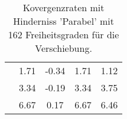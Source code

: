 \begin{table}
\begin{tabular}{c|cc|cc|}
\multicolumn{1}{|c|}{} & \multicolumn{1}{|c|}{      1.71} & \multicolumn{1}{|c|}{     -0.34} & \multicolumn{1}{|c|}{      1.71} & \multicolumn{1}{|c|}{      1.12} \\ 
\multicolumn{1}{|c|}{} & \multicolumn{1}{|c|}{      3.34} & \multicolumn{1}{|c|}{     -0.19} & \multicolumn{1}{|c|}{      3.34} & \multicolumn{1}{|c|}{      3.75} \\ 
\multicolumn{1}{|c|}{} & \multicolumn{1}{|c|}{      6.67} & \multicolumn{1}{|c|}{      0.17} & \multicolumn{1}{|c|}{      6.67} & \multicolumn{1}{|c|}{      6.46} \\ 
\hline 
\end{tabular}\caption{Kovergenzraten mit Hinderniss 'Parabel' mit 162 Freiheitsgraden für die Verschiebung.}\label{tab:Rate_Parabel_level2}
\end{table} 
